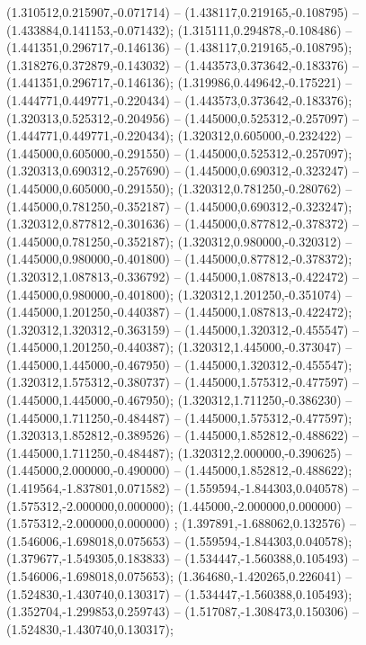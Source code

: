 (1.310512,0.215907,-0.071714) -- (1.438117,0.219165,-0.108795) -- (1.433884,0.141153,-0.071432);
 (1.315111,0.294878,-0.108486) -- (1.441351,0.296717,-0.146136) -- (1.438117,0.219165,-0.108795);
 (1.318276,0.372879,-0.143032) -- (1.443573,0.373642,-0.183376) -- (1.441351,0.296717,-0.146136);
 (1.319986,0.449642,-0.175221) -- (1.444771,0.449771,-0.220434) -- (1.443573,0.373642,-0.183376);
 (1.320313,0.525312,-0.204956) -- (1.445000,0.525312,-0.257097) -- (1.444771,0.449771,-0.220434);
 (1.320312,0.605000,-0.232422) -- (1.445000,0.605000,-0.291550) -- (1.445000,0.525312,-0.257097);
 (1.320313,0.690312,-0.257690) -- (1.445000,0.690312,-0.323247) -- (1.445000,0.605000,-0.291550);
 (1.320312,0.781250,-0.280762) -- (1.445000,0.781250,-0.352187) -- (1.445000,0.690312,-0.323247);
 (1.320312,0.877812,-0.301636) -- (1.445000,0.877812,-0.378372) -- (1.445000,0.781250,-0.352187);
 (1.320312,0.980000,-0.320312) -- (1.445000,0.980000,-0.401800) -- (1.445000,0.877812,-0.378372);
 (1.320312,1.087813,-0.336792) -- (1.445000,1.087813,-0.422472) -- (1.445000,0.980000,-0.401800);
 (1.320312,1.201250,-0.351074) -- (1.445000,1.201250,-0.440387) -- (1.445000,1.087813,-0.422472);
 (1.320312,1.320312,-0.363159) -- (1.445000,1.320312,-0.455547) -- (1.445000,1.201250,-0.440387);
 (1.320312,1.445000,-0.373047) -- (1.445000,1.445000,-0.467950) -- (1.445000,1.320312,-0.455547);
 (1.320312,1.575312,-0.380737) -- (1.445000,1.575312,-0.477597) -- (1.445000,1.445000,-0.467950);
 (1.320312,1.711250,-0.386230) -- (1.445000,1.711250,-0.484487) -- (1.445000,1.575312,-0.477597);
 (1.320313,1.852812,-0.389526) -- (1.445000,1.852812,-0.488622) -- (1.445000,1.711250,-0.484487);
 (1.320312,2.000000,-0.390625) -- (1.445000,2.000000,-0.490000) -- (1.445000,1.852812,-0.488622);
 (1.419564,-1.837801,0.071582) -- (1.559594,-1.844303,0.040578) -- (1.575312,-2.000000,0.000000);
 (1.445000,-2.000000,0.000000) -- (1.575312,-2.000000,0.000000) ;
 (1.397891,-1.688062,0.132576) -- (1.546006,-1.698018,0.075653) -- (1.559594,-1.844303,0.040578);
 (1.379677,-1.549305,0.183833) -- (1.534447,-1.560388,0.105493) -- (1.546006,-1.698018,0.075653);
 (1.364680,-1.420265,0.226041) -- (1.524830,-1.430740,0.130317) -- (1.534447,-1.560388,0.105493);
 (1.352704,-1.299853,0.259743) -- (1.517087,-1.308473,0.150306) -- (1.524830,-1.430740,0.130317);
